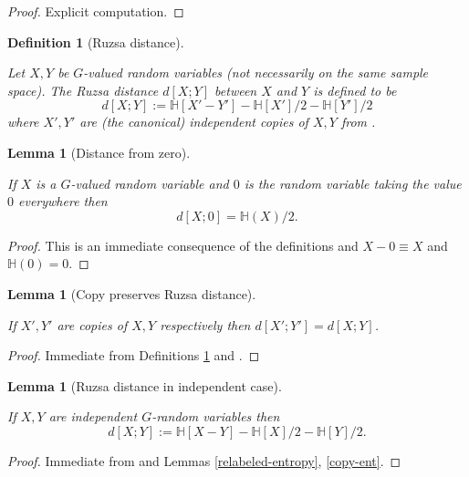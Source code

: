\documentclass[10pt,a4paper]{article}
\newtheorem{lemma}[theorem]{Lemma}
\newtheorem{definition}[theorem]{Definition}
\newcommand{\lean}[1]{}
\newcommand{\uses}[1]{}
\newcommand{\leanok}{}
\newcommand{\bbH}{\mathbb{H}}
\begin{document}
\begin{proof} \leanok
  Explicit computation.
\end{proof}

\begin{definition}[Ruzsa distance]\label{ruz-dist-def}
  \uses{entropy-def, independent-exist}
  \lean{rdist_def}\leanok
  Let $X,Y$ be $G$-valued random variables (not necessarily on the same sample space).  The \emph{Ruzsa distance} $d[X ;Y]$ between $X$ and $Y$ is defined to be
$$ d[X ;Y] := \bbH[X' - Y'] - \bbH[X']/2 - \bbH[Y']/2$$
where $X',Y'$ are (the canonical) independent copies of $X,Y$ from .
\end{definition}


\begin{lemma}[Distance from zero]\label{dist-zero}
  \uses{ruz-dist-def}\lean{rdist_zero_eq_half_ent}\leanok
If $X$ is a $G$-valued random variable and $0$ is the random variable taking the value $0$ everywhere then
\[d[X;0]=\mathbb{H}(X)/2.\]
\end{lemma}

\begin{proof}\leanok
This is an immediate consequence of the definitions and $X-0\equiv X$ and $\mathbb{H}(0)=0$.
\end{proof}

\begin{lemma}[Copy preserves Ruzsa distance]\label{ruz-copy}
  \uses{ruz-dist-def}
  \lean{ProbabilityTheory.IdentDistrib.rdist_congr}\leanok
  If $X',Y'$ are copies of $X,Y$ respectively then $d[X';Y']=d[X ;Y]$.
\end{lemma}

\begin{proof} \uses{copy-ent}\leanok Immediate from Definitions \ref{ruz-dist-def} and .
\end{proof}

\begin{lemma}[Ruzsa distance in independent case]\label{ruz-indep}
  \uses{ruz-dist-def}
  \lean{ProbabilityTheory.IndepFun.rdist_eq}\leanok
  If $X,Y$ are independent $G$-random variables then
  $$ d[X ;Y] := \bbH[X - Y] - \bbH[X]/2 - \bbH[Y]/2.$$
\end{lemma}

\begin{proof} \uses{relabeled-entropy, copy-ent}\leanok Immediate from  and Lemmas \ref{relabeled-entropy}, \ref{copy-ent}.
\end{proof}
\end{document}
